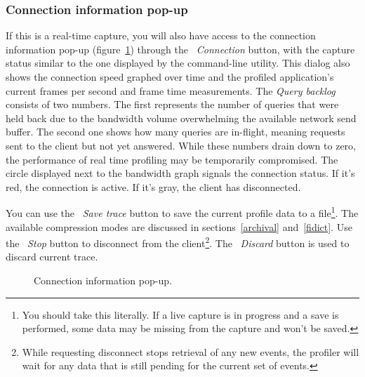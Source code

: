 \documentclass[hidelinks,titlepage,a4paper,twoside]{article}
\begin{document}
\subsubsection{Connection information pop-up}
\label{connectionpopup}

If this is a real-time capture, you will also have access to the connection information pop-up (figure~\ref{connectioninfo}) through the \emph{\faWifi{}~Connection} button, with the capture status similar to the one displayed by the command-line utility. This dialog also shows the connection speed graphed over time and the profiled application's current frames per second and frame time measurements. The \emph{Query backlog} consists of two numbers. The first represents the number of queries that were held back due to the bandwidth volume overwhelming the available network send buffer. The second one shows how many queries are in-flight, meaning requests sent to the client but not yet answered. While these numbers drain down to zero, the performance of real time profiling may be temporarily compromised. The circle displayed next to the bandwidth graph signals the connection status. If it's red, the connection is active. If it's gray, the client has disconnected.

You can use the \faFloppyDisk{}~\emph{Save trace} button to save the current profile data to a file\footnote{You should take this literally. If a live capture is in progress and a save is performed, some data may be missing from the capture and won't be saved.}. The available compression modes are discussed in sections~\ref{archival} and~\ref{fidict}. Use the \faPlug{}~\emph{Stop} button to disconnect from the client\footnote{While requesting disconnect stops retrieval of any new events, the profiler will wait for any data that is still pending for the current set of events.}. The \faTriangleExclamation{}~\emph{Discard} button is used to discard current trace.

\begin{figure}[h]
\centering{}
\caption{Connection information pop-up.}
\label{connectioninfo}
\end{figure}
\end{document}
